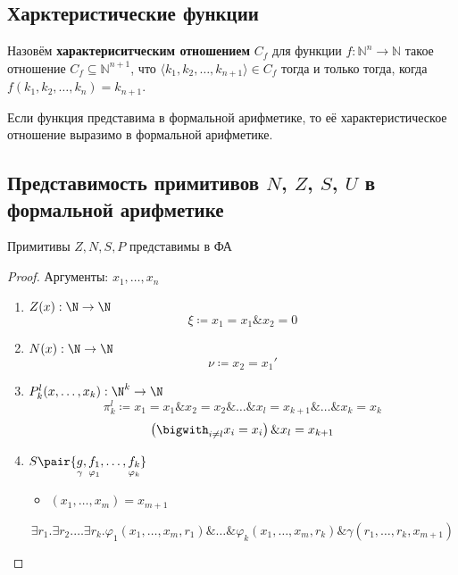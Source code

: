 \documentclass[english]{article}
\begin{document}
\subsection{Харктеристические функции}
\label{sec:org09c559e}
Назовём \textbf{характериситческим отношением} \(C_f\) для функции \(f: \mathbb{N}^n \rightarrow \mathbb{N}\)
такое отношение \(C_f\subseteq\mathbb{N}^{n+1}\), что
\(\langle k_1,k_2,\dots,k_{n+1} \rangle \in C_f\) тогда и только тогда, когда \(f(k_1,k_2,\dots,k_n) = k_{n+1}\).
\begin{lemma}
	Если функция представима в формальной арифметике, то её характеристическое отношение выразимо в формальной арифметике.
\end{lemma}
\subsection{Представимость примитивов \(N\), \(Z\), \(S\), \(U\) в формальной арифметике}
\label{sec:org9c0af38}
\begin{theorem}
	Примитивы \(Z, N, S, P\) представимы в ФА
	\label{orge5b7cb3}
\end{theorem}
\begin{proof}
	Аргументы: \(x_1, \dots, x_n\)
	\begin{enumerate}
		\item \(Z(x): \N \to \N\)
		      \[ \xi \coloneqq x_1 = x_1 \& x_2 = 0 \]
		\item \(N(x): \N \to \N\)
		      \[ \nu \coloneqq x_2 = x_1' \]
		\item \(P_k^l(x, \dots, x_k): \N^k \to \N\)
		      \[ \pi_k^l \coloneqq x_1 = x_1 \& x_2 = x_2 \& \dots \& x_l = x_{k + 1} \& \dots \& x_k = x_k\]
		      \[ \left(\bigwith_{i \neq l} x_i = x_i\right) \& x_l = x_{k + 1} \]
		\item \(S\pair{\underset{\gamma}{g}, \underset{\varphi_1}{f_1}, \dots, \underset{\varphi_k}{f_k}}\)
		      \begin{itemize}
			      \item \((x_1, \dots, x_m) = x_{m + 1}\)
		      \end{itemize}
		      \[ \exists r_1. \exists r_2. \dots\exists r_k. \varphi_1(x_1, \dots, x_m, r_1) \& \dots \& \varphi_k(x_1, \dots, x_m, r_k) \& \gamma(r_1, \dots, r_k, x_{m + 1}) \]
	\end{enumerate}
	\label{orgecd070a}
\end{proof}
\end{document}
